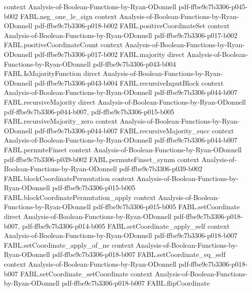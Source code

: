 \begin{theorem}
  {context}
  {Analysis-of-Boolean-Functions-by-Ryan-ODonnell}
  {pdf-ffbe9c7b3306-p045-b002}
\proofstep
  {FABL.neg_one_le_sign}
  {context}
  {Analysis-of-Boolean-Functions-by-Ryan-ODonnell}
  {pdf-ffbe9c7b3306-p018-b002}
\proofstep
  {FABL.positiveCoordinateSet}
  {context}
  {Analysis-of-Boolean-Functions-by-Ryan-ODonnell}
  {pdf-ffbe9c7b3306-p017-b002}
\proofstep
  {FABL.positiveCoordinateCount}
  {context}
  {Analysis-of-Boolean-Functions-by-Ryan-ODonnell}
  {pdf-ffbe9c7b3306-p017-b002}
\proofstep
  {FABL.majority}
  {direct}
  {Analysis-of-Boolean-Functions-by-Ryan-ODonnell}
  {pdf-ffbe9c7b3306-p043-b004}
\proofstep
  {FABL.IsMajorityFunction}
  {direct}
  {Analysis-of-Boolean-Functions-by-Ryan-ODonnell}
  {pdf-ffbe9c7b3306-p043-b004}
\proofstep
  {FABL.recursiveInputBlock}
  {context}
  {Analysis-of-Boolean-Functions-by-Ryan-ODonnell}
  {pdf-ffbe9c7b3306-p044-b007}
\proofstep
  {FABL.recursiveMajority}
  {direct}
  {Analysis-of-Boolean-Functions-by-Ryan-ODonnell}
  {pdf-ffbe9c7b3306-p044-b007,
    pdf-ffbe9c7b3306-p015-b005}
\proofstep
  {FABL.recursiveMajority_zero}
  {context}
  {Analysis-of-Boolean-Functions-by-Ryan-ODonnell}
  {pdf-ffbe9c7b3306-p044-b007}
\proofstep
  {FABL.recursiveMajority_succ}
  {context}
  {Analysis-of-Boolean-Functions-by-Ryan-ODonnell}
  {pdf-ffbe9c7b3306-p044-b007}
\proofstep
  {FABL.permuteFinset}
  {context}
  {Analysis-of-Boolean-Functions-by-Ryan-ODonnell}
  {pdf-ffbe9c7b3306-p039-b002}
\proofstep
  {FABL.permuteFinset_symm}
  {context}
  {Analysis-of-Boolean-Functions-by-Ryan-ODonnell}
  {pdf-ffbe9c7b3306-p039-b002}
\proofstep
  {FABL.blockCoordinatePermutation}
  {context}
  {Analysis-of-Boolean-Functions-by-Ryan-ODonnell}
  {pdf-ffbe9c7b3306-p015-b005}
\proofstep
  {FABL.blockCoordinatePermutation_apply}
  {context}
  {Analysis-of-Boolean-Functions-by-Ryan-ODonnell}
  {pdf-ffbe9c7b3306-p015-b005}
\proofstep
  {FABL.setCoordinate}
  {direct}
  {Analysis-of-Boolean-Functions-by-Ryan-ODonnell}
  {pdf-ffbe9c7b3306-p018-b007,
    pdf-ffbe9c7b3306-p014-b005}
\proofstep
  {FABL.setCoordinate_apply_self}
  {context}
  {Analysis-of-Boolean-Functions-by-Ryan-ODonnell}
  {pdf-ffbe9c7b3306-p018-b007}
\proofstep
  {FABL.setCoordinate_apply_of_ne}
  {context}
  {Analysis-of-Boolean-Functions-by-Ryan-ODonnell}
  {pdf-ffbe9c7b3306-p018-b007}
\proofstep
  {FABL.setCoordinate_eq_self}
  {context}
  {Analysis-of-Boolean-Functions-by-Ryan-ODonnell}
  {pdf-ffbe9c7b3306-p018-b007}
\proofstep
  {FABL.setCoordinate_setCoordinate}
  {context}
  {Analysis-of-Boolean-Functions-by-Ryan-ODonnell}
  {pdf-ffbe9c7b3306-p018-b007}
\proofstep
  {FABL.flipCoordinate}

\end{theorem}
